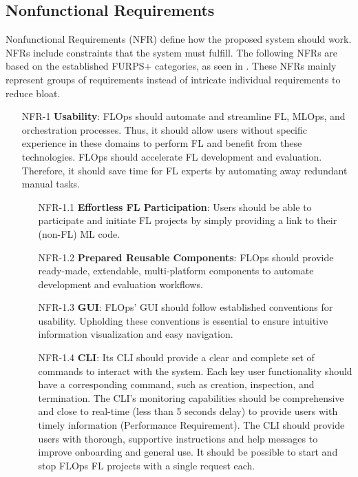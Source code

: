 \subsection{Nonfunctional Requirements}
Nonfunctional Requirements (NFR) define how the proposed system should work.
NFRs include constraints that the system must fulfill.
The following NFRs are based on the established FURPS+ categories, as seen in \cite{book:bruegge}.
These NFRs mainly represent groups of requirements instead of intricate individual requirements to reduce bloat.

\begin{itemize}
    \item [NFR-1] {\textbf{Usability}}:
        FLOps should automate and streamline FL, MLOps, and orchestration processes.
        Thus, it should allow users without specific experience in these domains to perform FL and benefit from these technologies.
        FLOps should accelerate FL development and evaluation.
        Therefore, it should save time for FL experts by automating away redundant manual tasks.
        \begin{itemize}
            \item [NFR-1.1] \textbf{Effortless FL Participation}:
                Users should be able to participate and initiate FL projects by simply providing a link to their (non-FL) ML code.
            \item [NFR-1.2] \textbf{Prepared Reusable Components}:
                FLOps should provide ready-made, extendable, multi-platform components to automate development and evaluation workflows.
            \item [NFR-1.3] \textbf{GUI}:
                FLOps' GUI should follow established conventions for usability.
                Upholding these conventions is essential to ensure intuitive information visualization and easy navigation.
            \item [NFR-1.4] \textbf{CLI}:
                Its CLI should provide a clear and complete set of commands to interact with the system.
                Each key user functionality should have a corresponding command, such as creation, inspection, and termination.
                The CLI's monitoring capabilities should be comprehensive and close to real-time (less than 5 seconds delay) to provide users with timely information (Performance Requirement).
                The CLI should provide users with thorough, supportive instructions and help messages to improve onboarding and general use.
                It should be possible to start and stop FLOps FL projects with a single request each.

\end{itemize}
\end{itemize}
